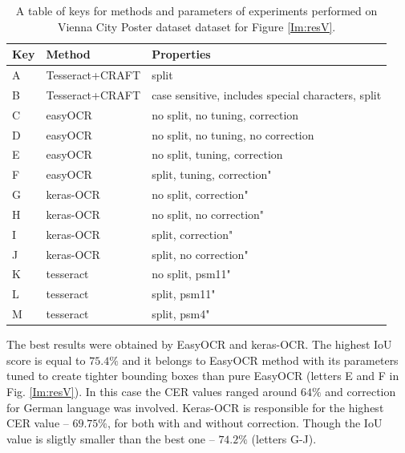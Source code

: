 \begin{table}[!ht]
    \centering
    \begin{tabular}{|l|l|l|}
    \hline
        Key & Method & Properties \\ \hline
        A & Tesseract+CRAFT & split \\
        B & Tesseract+CRAFT & case sensitive, includes special characters, split \\ \hline
        C & easyOCR & no split, no tuning, correction\\
        D & easyOCR & no split, no tuning, no correction \\
        E & easyOCR & no split, tuning, correction\\
        F & easyOCR & split, tuning, correction" \\ \hline
        G & keras-OCR & no split, correction" \\
        H & keras-OCR & no split, no correction" \\ 
        I & keras-OCR & split, correction" \\ 
        J & keras-OCR & split, no correction" \\ \hline
        K & tesseract & no split, psm11" \\ 
        L & tesseract & split, psm11" \\ 
        M & tesseract & split, psm4" \\ \hline
    \end{tabular}
    \caption{A table of keys for methods and parameters of experiments performed on Vienna City Poster dataset dataset for Figure \ref{Im:resV}.}
    \label{Tab:resV}
\end{table}

The best results were obtained by EasyOCR and keras-OCR. The highest IoU score is equal to $75.4\%$ and it belongs to EasyOCR method with its parameters tuned to create tighter bounding boxes than pure EasyOCR (letters E and F in Fig. \ref{Im:resV}). In this case the CER values ranged around $64\%$ and correction for German language was involved.
Keras-OCR is responsible for the highest CER value -- $69.75\%$, for both with and without correction. Though the IoU value is sligtly smaller than the best one -- $74.2\%$ (letters G-J). 

